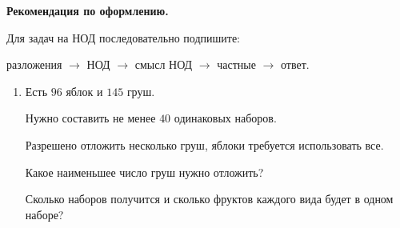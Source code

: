 \documentclass[a4paper,12pt]{article}
\begin{document}
\textbf{Рекомендация по оформлению.}

Для задач на НОД последовательно подпишите:

\begin{center}
разложения
$\rightarrow$
НОД
$\rightarrow$
смысл НОД
$\rightarrow$
частные
$\rightarrow$
ответ.
\end{center}

\begin{enumerate}


  \item
  Есть $96$ яблок и $145$ груш.

  Нужно составить
  не менее $40$ одинаковых наборов.

  Разрешено отложить несколько груш,
  яблоки требуется использовать все.

  Какое наименьшее число груш
  нужно отложить?

  Сколько наборов получится
  и сколько фруктов каждого вида
  будет в одном наборе?


\end{enumerate}
\end{document}
